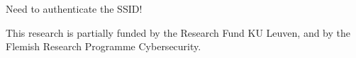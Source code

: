 \documentclass[sigconf,review]{acmart}
\begin{document}
Need to authenticate the SSID!

\begin{acks}
This research is partially funded by the Research Fund KU Leuven, and by the Flemish Research Programme Cybersecurity.
\end{acks}




\end{document}
